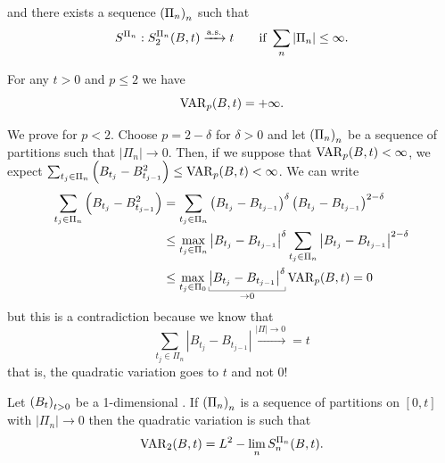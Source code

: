 \documentclass[12pt]{report}
\begin{document}
and there exists a sequence ${\left({\Pi}_{n}\right)}_{n}$ such that
\begin{equation*}
	S^{\Pi_{n}}:S_{2}^{\Pi_{n}}(B,t)\xrightarrow[]{\text{a.s.}} t \qquad\text{if }\sum_{n}|\Pi_{n}|\leq\infty.
\end{equation*}
\begin{proposition}
	For any $t>0$ and $p\leq2$ we have
	\begin{equation*}
		\mathrm{VAR}_{p}(B,t)=+\infty.
	\end{equation*}
\end{proposition}
\begin{fancyproof}
	We prove for $p<2$. Choose $p=2-\delta$ for $\delta>0$ and let ${\left({\Pi}_{n}\right)}_{n}$ be a sequence of partitions such that $|\Pi_{n}|\to0$. Then, if we suppose that $\mathrm{VAR}_{p}(B,t)<\infty$, we expect $\sum_{t_{j}\in\Pi_{n}}\left(B_{t_{j}}-B_{t_{j-1}}^{2}\right)\leq\mathrm{VAR}_{p}(B,t)<\infty$. We can write
	\begin{align*}
		\sum_{t_{j}\in\Pi_{n}}\left(B_{t_{j}}-B_{t_{j-1}}^{2}\right)&=\sum_{t_{j}\in\Pi_{n}}\left(B_{t_{j}}-B_{t_{j-1}}\right)^{\delta}\left(B_{t_{j}}-B_{t_{j-1}}\right)^{2-\delta}\\
		&\leq\max_{t_{j}\in\Pi_{n}}\left|B_{t_{j}}-B_{t_{j-1}}\right|^{\delta}\sum_{t_{j}\in\Pi_{n}}\left|B_{t_{j}}-B_{t_{j-1}}\right|^{2-\delta}\\
		&\leq\max_{t_{j}\in\Pi_{0}}\ubracketthin{\left|B_{t_{j}}-B_{t_{j-1}}\right|^{\delta}}_{\to0}\vari_{p}(B,t)=0
	\end{align*}
	but this is a contradiction because we know that 
	\begin{equation*}
		\sum_{t_{j}\in\Pi_{n}}\left|B_{t_{j}}-B_{t_{j-1}}\right|\xrightarrow{|\Pi|\to0}=t
	\end{equation*}
	that is, the quadratic variation goes to $t$ and not 0!
\end{fancyproof}
\begin{theorem}
	Let ${\left({B}_{t}\right)}_{t>0}$ be a 1-dimensional \bwm. If ${\left({\Pi}_{n}\right)}_{n}$ is a sequence of partitions on $[0,t]$ with $\left|\Pi_{n}\right|\to0$ then the quadratic variation is such that $$\mathrm{VAR}_{2}(B,t)=L^{2}-\lim_{n}S_{n}^{\Pi_{n}}(B,t).$$
\end{theorem}
\end{document}
